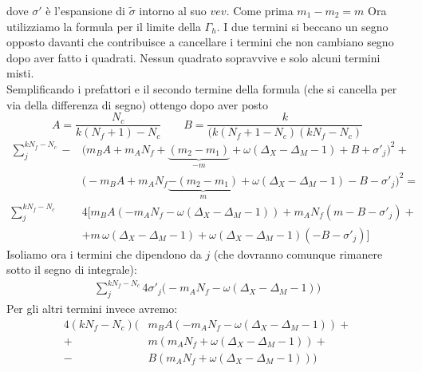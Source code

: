 \documentclass[a4paper,12pt]{article}
\begin{document}
dove $\sigma'$ è l'espansione di $\tilde{\sigma}$ intorno al suo $vev$. Come prima $m_1 - m_2 = m $
Ora utilizziamo la formula per il limite della $\Gamma_h$. I due termini si beccano un segno opposto davanti che contribuisce a cancellare i termini che non cambiano segno dopo aver fatto i quadrati. Nessun quadrato sopravvive e solo alcuni termini misti.\\
Semplificando i prefattori e il secondo termine della formula (che si cancella per via della differenza di segno) ottengo dopo aver posto 
$$
 A = \frac{N_c}{k(N_f+1) - N_c} \qquad B = \frac{k}{(k(N_f+1-N_c)(k N_f - N_c)}
$$
\begin{align*}
\sum_j^{k N_f - N_c}- &\big( m_B  A + m_A N_f + \underbrace{{(m_2 - m_1 )}}_{-m} + \omega( \Delta_X - \Delta_M - 1) + B + \sigma'_j \big)^2  + \\
& \big( - m_B  A + m_A N_f \underbrace{- (m_2 - m_1 )}_{m} + \omega( \Delta_X - \Delta_M - 1) - B - \sigma'_j \big)^2 = \\
\sum_j^{k N_f - N_c} & 4 \big[  m_B A \left( -  m_A N_f - \omega( \Delta_X - \Delta_M - 1) \right) + m_A N_f ( m - B - \sigma'_j ) +\\
&+ m \, \omega( \Delta_X - \Delta_M - 1) +  \omega( \Delta_X - \Delta_M - 1)( -B - \sigma'_j) \big]
\end{align*}
Isoliamo ora i termini che dipendono da $j$ (che dovranno comunque rimanere sotto il segno di integrale):
\begin{align*}
\sum_j^{k N_f - N_c} 4 \sigma'_j \big( - m_A N_f -  \omega( \Delta_X - \Delta_M - 1) \big) 
\end{align*}
Per gli altri termini invece avremo:
\begin{align*}
4 ( k N_f - N_c ) \big( & m_B A (  -  m_A N_f - \omega( \Delta_X - \Delta_M - 1)) +\\
 +  & m ( m_A N_f + \omega( \Delta_X - \Delta_M - 1)) + \\ 
   - &   B ( m_A N_f + \omega( \Delta_X - \Delta_M - 1)) \big)
\end{align*}
\end{document}

